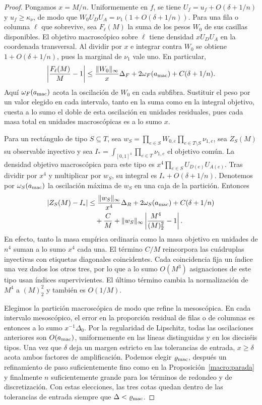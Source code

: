 \begin{proof}
Pongamos $x=M/n$. Uniformemente en $f$, se tiene $U_f=u_f+O(\delta+1/n)$ y $u_f\ge\kappa_\nu$, de
modo que $W_0U_DU_A=\nu_1(1+O(\delta+1/n))$. Para una fila o columna $\ell$ que sobrevive, sea
$F_\ell(M)$ la suma de los pesos $W_0$ de sus casillas disponibles. El objetivo macroscópico sobre
$\ell$ tiene densidad $xU_DU_A$ en la coordenada transversal. Al dividir por $x$ e integrar contra
$W_0$ se obtiene $1+O(\delta+1/n)$, pues la marginal de $\nu_1$ vale uno. En particular,
\[
 \left|\frac{F_\ell(M)}M-1\right|
 \le \frac{\|W_0\|_\infty}{x}\Delta_F+2\omega_F(a_{\rm mac})+C(\delta+1/n).
\]
Aquí $\omega_F(a_{\rm mac})$ acota la oscilación de $W_0$ en cada subfibra. Sustituir el peso por
un valor elegido en cada intervalo, tanto en la suma como en la integral objetivo, cuesta a lo sumo
el doble de esta oscilación en unidades residuales, pues cada masa total en unidades macroscópicas
es a lo sumo $x$.

Para un rectángulo de tipo $S\subseteq T$, sea
$w_S=\prod_{e\in S}W_{0,e}\prod_{e\in T\setminus S}\nu_{1,e}$, sea $Z_S(M)$ su observable inyectivo
y sea $I_*=\int_{[0,1]^4}\prod_{e\in T}\nu_{1,e}$ el objetivo
común. La densidad objetivo macroscópica para este tipo es $x^4\prod_{e\in S}U_{D(e)}U_{A(e)}$.
Tras dividir por $x^4$ y multiplicar por $w_S$, su integral es $I_*+O(\delta+1/n)$. Denotemos por
$\omega_S(a_{\rm mac})$ la oscilación máxima de $w_S$ en una caja de la partición. Entonces
\begin{align*}
 |Z_S(M)-I_*|
 &\le \frac{\|w_S\|_\infty}{x^4}\Delta_R+2\omega_S(a_{\rm mac})+C(\delta+1/n)\\
 &\quad +\frac{C}{M}+\|w_S\|_\infty\left|\frac{M^4}{(M)_2^2}-1\right| .
\end{align*}
En efecto, tanto la masa empírica ordinaria como la masa objetivo en unidades de $n^4$ suman a lo
sumo $x^4$ cada una. El término $C/M$ reincorpora las cuádruplas inyectivas con etiquetas diagonales
coincidentes. Cada coincidencia fija un índice una vez dados los otros tres, por lo que a lo sumo
$O(M^3)$ asignaciones de este tipo usan índices supervivientes. El último término cambia la
normalización de $M^4$ a $(M)_2^2$ y también es $O(1/M)$.

Elegimos la partición macroscópica de modo que refine la mesoscópica. En cada intervalo mesoscópico,
el error en la proporción residual de filas o de columnas es entonces a lo sumo $x^{-1}\Delta_0$.
Por la regularidad de Lipschitz, todas las oscilaciones anteriores son $O(a_{\rm mac})$,
uniformemente en las líneas distinguidas y en los dieciséis tipos. Una vez que $\delta$ deja un
margen estricto en las tolerancias de entrada, $x\ge\delta$ acota ambos factores de amplificación.
Podemos elegir $\varrho_{\rm mac}$, después un refinamiento de paso suficientemente fino como en la
Proposición~\ref{macro:parada} y finalmente $n$ suficientemente grande para los términos de redondeo
y de discretización. Con estas elecciones, las tres cotas quedan dentro de las tolerancias de entrada
siempre que $\Delta<\varrho_{\rm mac}$.


\end{proof}
